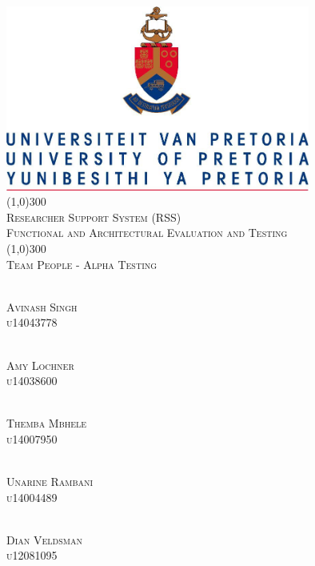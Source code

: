 \documentclass{article}
\begin{document}
\begin{titlepage}
	\begin{center}
		\includegraphics[width=10cm]{UP.jpg}  \\
		[1cm]
		\line(1,0){300} \\
		[0.3cm]
		\textsc{\Large
			Researcher Support System (RSS)\\
			Functional and Architectural Evaluation and Testing
		}\\
		[0.1cm]
		\line(1,0){300} \\
		[0.4cm]
		\textsc{\Large
			Team People - Alpha Testing
		} \\
		
		
		
	\end{center}
	\begin{center}
		
		\textsc{\large\\
			Avinash Singh\\ 
			u14043778\\ 
		}
		
		\textsc{\large\\
			Amy Lochner\\
			u14038600\\ 
		}
		
		\textsc{\large\\
			Themba Mbhele\\
			u14007950\\ 
		}
		
		\textsc{\large\\
			Unarine Rambani\\
			u14004489 \\
		}
		
		\textsc{\large\\
			Dian Veldsman\\
			u12081095\\
		}
		
	\end{center}
\end{titlepage}
\end{document}

